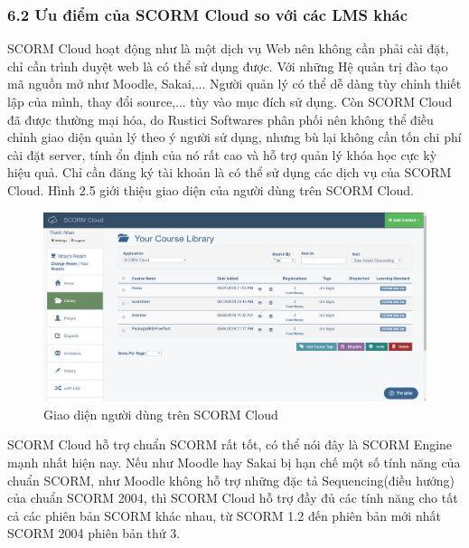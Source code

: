 \subsubsection{6.2 Ưu điểm của SCORM Cloud so với các LMS khác}
SCORM Cloud hoạt động như là một dịch vụ Web nên không cần phải cài đặt, chỉ cần trình duyệt web là có thể sử dụng được. Với những Hệ quản trị đào tạo mã nguồn mở như Moodle, Sakai,... Người quản lý có thể dễ dàng tùy chỉnh thiết lập của mình, thay đổi source,... tùy vào mục đích sử dụng. Còn SCORM Cloud đã được thường mại hóa, do Rustici Softwares phân phối nên không  thể điều chỉnh giao diện quản lý theo ý người sử dụng, nhưng bù lại không cần tốn chi phí cài đặt server, tính ổn định của nó rất cao và hỗ trợ quản lý khóa học cực kỳ hiệu quả. Chỉ cần đăng ký tài khoản là có thể sử dụng các dịch vụ của SCORM Cloud. Hình 2.5 giới thiệu giao diện của người dùng trên SCORM Cloud.\\

\begin{center}
	\begin{figure}[htp]
		\begin{center}
			\includegraphics[width=17cm]{Chapter2/Pictures/picture25.png}
		\end{center}
		\caption{Giao diện người dùng trên SCORM Cloud}
		\label{refpicture25}
	\end{figure}
\end{center}


SCORM Cloud hỗ trợ chuẩn SCORM rất tốt, có thể nói đây là SCORM Engine mạnh nhất hiện nay. Nếu như Moodle hay Sakai bị hạn chế một số tính năng của chuẩn SCORM,  như Moodle không hỗ trợ những đặc tả Sequencing(điều hướng) của chuẩn SCORM 2004,  thì SCORM Cloud hỗ trợ đầy đủ các tính năng cho tất cả các phiên bản SCORM khác nhau, từ SCORM 1.2 đến phiên bản mới nhất SCORM 2004 phiên bản thứ 3.\\

